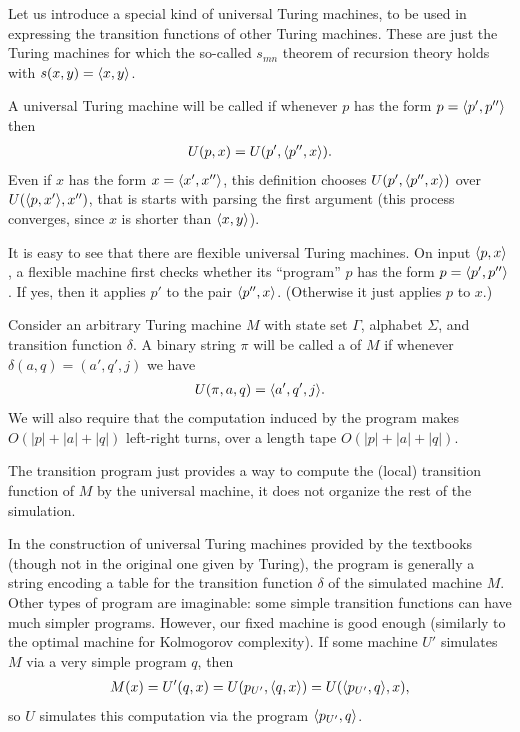 \documentclass[12pt]{memoir}
\begin{document}
Let us introduce a special kind of universal Turing machines, to be
used in expressing the transition functions of other Turing machines.
These are just the Turing machines for which the so-called \( s_{mn} \) theorem
of recursion theory holds with \( s(x,y)={\mathopen\langle x,y\mathclose\rangle} \).

\begin{definition}\label{def:univ-TM}
A universal Turing machine will be called  if 
whenever \( p \) has the form \( p={\mathopen\langle p',p''\mathclose\rangle} \) then
\begin{align*}
 U(p,x)= U(p',{\mathopen\langle p'',x\mathclose\rangle}).
 \end{align*}
Even if \( x \) has the form \(x ={\mathopen\langle x',x''\mathclose\rangle} \), this definition chooses
\( U(p',{\mathopen\langle p'',x\mathclose\rangle}) \) over \( U({\mathopen\langle p,x'\mathclose\rangle},x'') \), that is starts with 
parsing the first argument
(this process converges, since \( x \) is  shorter than \( {\mathopen\langle x,y\mathclose\rangle} \)).
\end{definition}

It is easy to see that there are flexible universal Turing machines.
On input \( {\mathopen\langle p,x\mathclose\rangle} \),
a flexible machine first checks whether its ``program'' \( p \) 
has the form \( p={\mathopen\langle p',p''\mathclose\rangle} \).
If yes, then it applies \( p' \) to the pair \( {\mathopen\langle p'',x\mathclose\rangle} \).
(Otherwise it just applies \( p \) to \( x \).)

\begin{definition}
  Consider an arbitrary Turing machine \( M \) with state set \( \Gamma \), alphabet
\( \Sigma \), and transition function \( \delta \).
A binary string \( \pi \) will be called a  of \( M \) if
whenever \( \delta(a,q)=(a',q',j) \) we have
 \begin{align*}
 U(\pi,a,q)={\mathopen\langle a',q',j\mathclose\rangle}.
 \end{align*}
We will also require that the computation induced by the program makes
\( O(|p|+|a|+|q|) \) left-right turns, over a length tape \( O(|p|+|a|+|q|) \).
\end{definition}

The transition program just provides a way to compute
the (local) transition function of \( M \) by the universal machine,
it does not organize the rest of the simulation.

\begin{remark}
 In the construction of universal Turing machines provided by the textbooks
(though not in the original one given by Turing), the program is generally a string
encoding a table for the transition
function \( \delta \) of the simulated machine \( M \).
Other types of program are imaginable: some simple transition functions can
have much simpler programs.
However, our fixed machine is good enough (similarly to the optimal machine
for Kolmogorov complexity).
If some machine \( U' \) simulates \( M \) via a
very simple program \( q \), then
 \begin{align*}
     M(x)=U'(q,x) = U(p_{U'},{\mathopen\langle q,x\mathclose\rangle}) = U({\mathopen\langle p_{U'},q\mathclose\rangle},x),
 \end{align*}
so \( U \) simulates this computation via the program \( {\mathopen\langle p_{U'},q\mathclose\rangle} \).
\end{remark}
\end{document}

